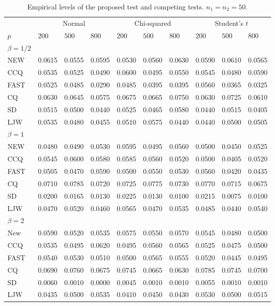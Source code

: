 \documentclass[times,sort&compress,3p]{elsarticle}
\theoremstyle{plain}
\theoremstyle{definition}
\theoremstyle{remark}
\begin{document}
\begin{table}[ht]
\caption{Empirical levels of the proposed test and competing tests. $n_1=n_2=50$.} 
\label{hahaha1}
\vspace{3mm}
\centering
\begin{tabular}{llllllllll}
\toprule
    &   \multicolumn{3}{c}{Normal} & \multicolumn{3}{c}{Chi-squared}& \multicolumn{3}{c}{Student's $t$}  \\
    \cmidrule(r){2-4}
\cmidrule(r){5-7}
\cmidrule(r){8-10}
    $p$ & $200$ &  $500$ & $800$ & $200$  & $500$ & $800$ & $200$ & $500$ & $800$ \\ 
\midrule
    $\beta=1/2$\\
NEW & 0.0615 & 0.0555 & 0.0595 & 0.0530 & 0.0560 & 0.0630 & 0.0590 & 0.0610 & 0.0565 \\ 
CCQ & 0.0535 & 0.0525 & 0.0490 & 0.0600 & 0.0495 & 0.0550 & 0.0545 & 0.0480 & 0.0590 \\ 
FAST & 0.0525 & 0.0485 & 0.0290 & 0.0485 & 0.0395 & 0.0395 & 0.0560 & 0.0365 & 0.0325 \\ 
CQ & 0.0630 & 0.0645 & 0.0575 & 0.0675 & 0.0665 & 0.0750 & 0.0630 & 0.0725 & 0.0610 \\ 
SD & 0.0515 & 0.0500 & 0.0440 & 0.0525 & 0.0465 & 0.0580 & 0.0440 & 0.0515 & 0.0405 \\ 
LJW & 0.0535 & 0.0480 & 0.0455 & 0.0510 & 0.0575 & 0.0440 & 0.0440 & 0.0500 & 0.0505 \\ 
    $\beta=1$\\
NEW & 0.0480 & 0.0490 & 0.0530 & 0.0595 & 0.0495 & 0.0560 & 0.0500 & 0.0450 & 0.0525 \\ 
CCQ & 0.0545 & 0.0600 & 0.0580 & 0.0585 & 0.0560 & 0.0520 & 0.0500 & 0.0405 & 0.0520 \\ 
FAST & 0.0505 & 0.0470 & 0.0590 & 0.0500 & 0.0550 & 0.0530 & 0.0560 & 0.0420 & 0.0435 \\ 
CQ & 0.0710 & 0.0785 & 0.0720 & 0.0725 & 0.0775 & 0.0730 & 0.0770 & 0.0715 & 0.0675 \\ 
SD & 0.0200 & 0.0165 & 0.0130 & 0.0225 & 0.0130 & 0.0100 & 0.0215 & 0.0075 & 0.0100 \\ 
LJW & 0.0470 & 0.0520 & 0.0460 & 0.0565 & 0.0470 & 0.0535 & 0.0485 & 0.0440 & 0.0540 \\ 
    $\beta=2$\\
New & 0.0590 & 0.0520 & 0.0535 & 0.0575 & 0.0550 & 0.0570 & 0.0545 & 0.0480 & 0.0500 \\ 
CCQ & 0.0535 & 0.0495 & 0.0620 & 0.0495 & 0.0560 & 0.0565 & 0.0525 & 0.0475 & 0.0500 \\ 
FAST & 0.0540 & 0.0530 & 0.0510 & 0.0500 & 0.0565 & 0.0555 & 0.0520 & 0.0445 & 0.0495 \\ 
CQ & 0.0690 & 0.0760 & 0.0675 & 0.0745 & 0.0665 & 0.0630 & 0.0785 & 0.0745 & 0.0700 \\ 
SD & 0.0060 & 0.0010 & 0.0000 & 0.0045 & 0.0010 & 0.0010 & 0.0055 & 0.0010 & 0.0010 \\ 
LJW & 0.0435 & 0.0500 & 0.0535 & 0.0410 & 0.0450 & 0.0430 & 0.0530 & 0.0500 & 0.0515 \\ 
\bottomrule
\end{tabular}
\end{table}
\end{document}
